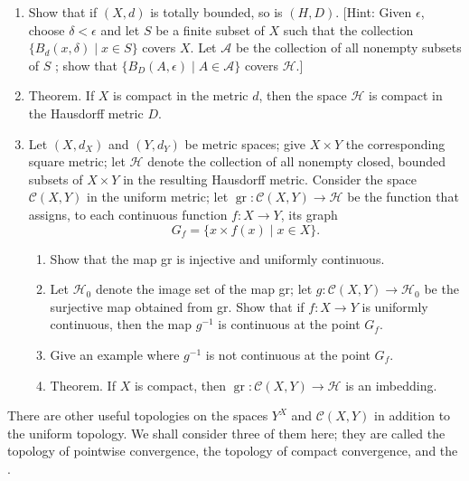 \begin{enumerate}[itemsep=0.4em, parsep=0pt, topsep=0pt, partopsep=0pt, leftmargin=*, label=\arabic*., ref=\arabic*]
\begin{enumerate}[itemsep=0.2em, parsep=0pt, topsep=0pt, partopsep=0pt, leftmargin=*, label=(\alph*), align=left]
 \item Show that if \((X, d)\) is totally bounded, so is \((H, D)\). [Hint: Given \(\epsilon\), choose \(\delta < \epsilon\) and let \(S\) be a finite subset of \(X\) such that the collection \(\{ B_{d}({x,\delta }) \mid x \in S\}\) covers \(X\). Let \(\mathcal{A}\) be the collection of all nonempty subsets of \(S\) ; show that \(\{ {B_{D}({A,\epsilon }) \mid A \in \mathcal{A}}\}\) covers \(\mathcal{H}\).]
 \item Theorem. If \(X\) is compact in the metric \(d\), then the space \(\mathcal{H}\) is compact in the Hausdorff metric \(D\).
\item[*8.] Let \(({X,d_{X}})\) and \(({Y,d_{Y}})\) be metric spaces; give \(X \times Y\) the corresponding square metric; let \(\mathcal{H}\) denote the collection of all nonempty closed, bounded subsets of \(X \times Y\) in the resulting Hausdorff metric. Consider the space \(\mathcal{C}({X,Y})\) in the uniform metric; let \(\operatorname{gr} : \mathcal{C}({X,Y}) \rightarrow \mathcal{H}\) be the function that assigns, to each continuous function \(f : X \rightarrow Y\), its graph \[ G_{f} = \{ x \times f(x) \mid x \in X\}. \]
  \begin{enumerate}[itemsep=0.2em, parsep=0pt, topsep=0pt, partopsep=0pt, leftmargin=*, label=(\alph*), align=left]
  \item Show that the map gr is injective and uniformly continuous.
  \item Let \(\mathcal{H}_{0}\) denote the image set of the map gr; let \(g : \mathcal{C}({X,Y}) \rightarrow {\mathcal{H}}_{0}\) be the surjective map obtained from gr. Show that if \(f : X \rightarrow Y\) is uniformly continuous, then the map \(g^{-1}\) is continuous at the point \(G_{f}\).
  \item Give an example where \(g^{-1}\) is not continuous at the point \(G_{f}\).
  \item Theorem. If \(X\) is compact, then \(\operatorname{gr} : \mathcal{C}({X,Y}) \rightarrow \mathcal{H}\) is an imbedding.
  \end{enumerate}
 \end{enumerate}
\end{enumerate}

There are other useful topologies on the spaces \(Y^{X}\) and \(\mathcal{C}({X,Y})\) in addition to the uniform topology. We shall consider three of them here; they are called the topology of pointwise convergence, the topology of compact convergence, and the .

